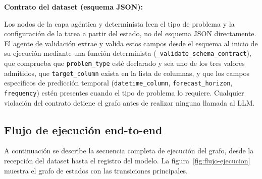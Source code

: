\textbf{Contrato del dataset (esquema JSON):}

Los nodos de la capa agéntica y determinista leen el tipo de problema y la configuración de la tarea a partir del estado, no del esquema JSON directamente. El agente de validación extrae y valida estos campos desde el esquema al inicio de su ejecución mediante una función determinista (\texttt{\_validate\_schema\_contract}), que comprueba que \texttt{problem\_type} esté declarado y sea uno de los tres valores admitidos, que \texttt{target\_column} exista en la lista de columnas, y que los campos específicos de predicción temporal (\texttt{datetime\_column}, \texttt{forecast\_horizon}, \texttt{frequency}) estén presentes cuando el tipo de problema lo requiere. Cualquier violación del contrato detiene el grafo antes de realizar ninguna llamada al LLM.


\subsection{Flujo de ejecución end-to-end}
\label{sec:flujo-ejecucion}

A continuación se describe la secuencia completa de ejecución del grafo, desde la recepción del dataset hasta el registro del modelo. La figura~\ref{fig:flujo-ejecucion} muestra el grafo de estados con las transiciones principales.

